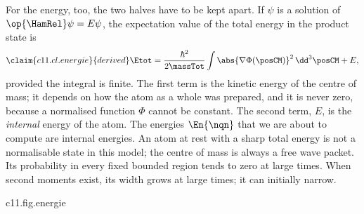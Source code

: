 For the energy, too, the two halves have to be kept apart. If $\psi$ is a solution of
$\op{\HamRel}\psi = E\psi$, the expectation value of the total energy in the product state is
\begin{equation}\label{c11.eq.energie}\claim{c11.cl.energie}{derived}
  \Etot = \frac{\hbar^2}{2\massTot} \int \abs{\nabla\Phi(\posCM)}^2 \,\dd^3\posCM + E ,
\end{equation}
provided the integral is finite. The first term is the kinetic energy of the centre of
mass; it depends on how the atom as a whole was prepared, and it is never zero, because a
normalised function $\Phi$ cannot be constant. The second term, $E$, is the
\emph{internal} energy of the atom. The energies $\En{\nqn}$ that we are about to compute
are internal energies. An atom at rest with a sharp total energy is not a normalisable
state in this model; the centre of mass is always a free wave packet. Its probability
in every fixed bounded region tends to zero at large times. When second moments
exist, its width grows at large times; it can initially narrow.

\begin{tpcfigure}{c11.fig.energie}
  \caption{Internal energy and total energy according to \eqref{c11.eq.energie}, for $\Znuc = 1$ and in units of the Rydberg energy $\RydRed$ of Section~\ref{c11.s4}. The heavy strokes are the internal energies $\En{1}$, $\En{2}$, $\En{3}$ of Theorem~\ref{c11.thm.spektrum}. Hatched in each case is the range in which the expectation value of the total energy can lie: it begins at the internal energy and has no upper end, because the kinetic energy of the centre of mass can have any positive value.}
\end{tpcfigure}

